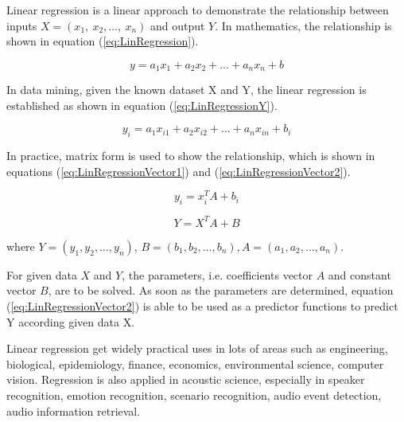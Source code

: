 \documentclass[runningheads,a4paper]{llncs}
\begin{document}
Linear regression is a linear approach to demonstrate the relationship between inputs $X=(x_1,\ x_2, \dots, \  x_n)$ and output $Y$. In mathematics, the relationship is shown in equation (\ref{eq:LinRegression})\cite{Colin15applied}.

\begin{equation}\label{eq:LinRegression}
    y=a_1x_1+a_2x_2+\dots+a_nx_n+b
\end{equation}\label{eq:LinRegression}

In data mining, given the known dataset X and Y, the linear regression is established as shown in equation (\ref{eq:LinRegressionY}).

\begin{equation}\label{eq:LinRegressionY}
    y_i=a_1x_{i1}+a_2x_{i2}+\dots+a_nx_{in}+b_i
\end{equation}\label{eq:LinRegressionY}

In practice, matrix form is used to show the relationship, which is shown in equations (\ref{eq:LinRegressionVector1}) and (\ref{eq:LinRegressionVector2}).

\begin{equation}\label{eq:LinRegressionVector1}
    y_i=x_i^TA+b_i
\end{equation}\label{eq:LinRegressionVector1}

\begin{equation}\label{eq:LinRegressionVector2}
    Y=X^TA+B
\end{equation}\label{eq:LinRegressionVector2}

where $Y=(y_1, y_2, \dots, y_n)$, $B=(b_1, b_2, \dots, b_n), A=(a_1, a_2, \dots, a_n)$.

For given data $X$ and $Y$, the parameters, i.e. coefficients vector $A$ and constant vector $B$, are to be solved. As soon as the parameters are determined, equation (\ref{eq:LinRegressionVector2}) is able to be used as a predictor functions to predict Y according given data X.

Linear regression get widely practical uses in lots of areas such as engineering\cite{Rice04a}\cite{Vincent13determinants}, biological\cite{Vieira2016On}, epidemiology\cite{Paul13a}, finance\cite{Vincent13determinants}, economics\cite{Ehrenberg08}, environmental science\cite{piegorsch2005analyzing}, computer vision\cite{Xiujuan07locally}. Regression is also applied in acoustic science, especially in speaker recognition, emotion recognition, scenario recognition, audio event detection, audio information retrieval\cite{Alina14detecting}\cite{Zhao15invest}\cite{chen14linear}.
\end{document}
